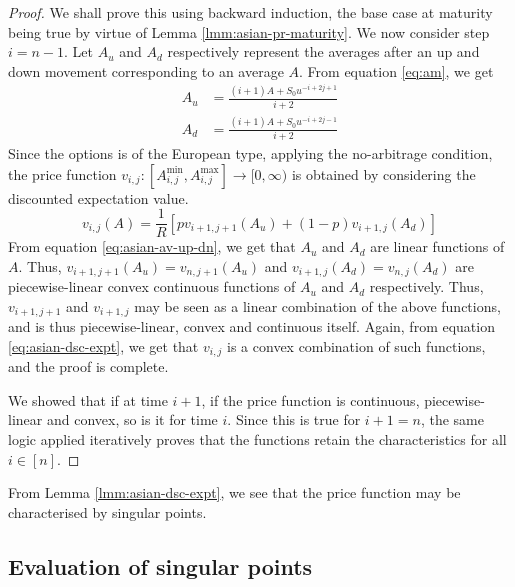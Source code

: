 \begin{proof}
	We shall prove this using backward induction, the base case at maturity being true by virtue of Lemma \ref{lmm:asian-pr-maturity}.
	We now consider step $ i = n-1 $. Let $A_u$ and $A_d$ respectively represent the averages after an up and down movement corresponding to an average $A$. From equation \ref{eq:am}, we get
	\begin{subequations}
		\label{eq:asian-av-up-dn}
		\begin{align}
			A_u &= \frac{ (i+1) A + S_0 u^{-i+2j+1} }{ i+2 } \\
			A_d &= \frac{ (i+1) A + S_0 u^{-i+2j-1} }{ i+2 }
		\end{align}
	\end{subequations}
	Since the options is of the European type, applying the no-arbitrage condition, the price function $ v_{i,j}: \left[ A_{i,j}^{\min}, A_{i,j}^{\max} \right] \to [0, \infty) $ is obtained by considering the discounted expectation value.
	\begin{equation}
		\label{eq:asian-dsc-expt}
		v_{i,j}(A) = \frac{1}{R} \left[ p v_{i+1,j+1}(A_u) + (1 - p) v_{i+1,j}(A_d) \right]
	\end{equation}
	From equation \ref{eq:asian-av-up-dn}, we get that $A_u$ and $A_d$ are linear functions of $A$. Thus, $ v_{i+1,j+1}(A_u) = v_{n,j+1}(A_u)$ and $ v_{i+1,j}(A_d) = v_{n,j}(A_d) $ are piecewise-linear convex continuous functions of $A_u$ and $A_d$ respectively. Thus, $ v_{i+1,j+1} $ and $ v_{i+1,j} $ may be seen as a linear combination of the above functions, and is thus piecewise-linear, convex and continuous itself. Again, from equation \ref{eq:asian-dsc-expt}, we get that $v_{i,j}$ is a convex combination of such functions, and the proof is complete.
	
	We showed that if at time $ i+1 $, if the price function is continuous, piecewise-linear and convex, so is it for time $ i $. Since this is true for $ i+1 = n $, the same logic applied iteratively proves that the functions retain the characteristics for all $ i \in [n] $.
\end{proof}


\begin{rem}
	From Lemma \ref{lmm:asian-dsc-expt}, we see that the price function may be characterised by singular points.
\end{rem}



\subsection{Evaluation of singular points}
\label{subsec:asian-eu-eval}

